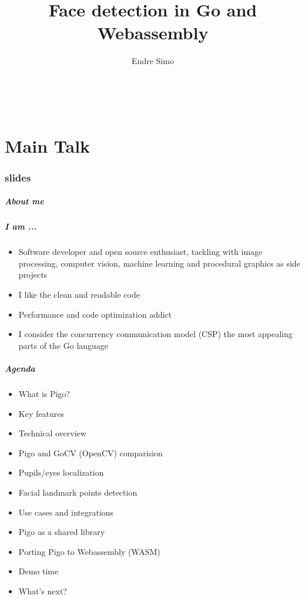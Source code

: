 \documentclass[9pt]{beamer}
\title[Face detection in Go and Webassembly]{Face detection in Go and Webassembly}
\author[Endre Simo]{
 \parbox{0.26\textwidth}{
	\texorpdfstring
	  {
		\centering
 		Endre Simo \\
 		\myblue{\href{https://esimov.com}{\texttt{https://esimov.com}}} \\
 		\myblue{\href{https://github.com/esimov}{\texttt{https://github.com/esimov}}} \\
 		\myblue{\href{https://twitter/simo_endre}{\texttt{https://twitter/simo\_endre}}} \\
 	  }
	{Endre Simo}
}
 }
\begin{document}
\frame{\titlepage
}

\part<presentation>{Main Talk}

\section[slides]{slides}

\begin{frame}[fragile]
\frametitle{About me}


\end{frame}

\begin{frame}[fragile]
\frametitle{I am ...}


\begin{itemize}
\item Software developer and open source enthusiast, tackling with image processing, computer vision, machine learning and procedural graphics as side projects
\item I like the clean and readable code
\item Performance and code optimization addict
\item I consider the concurrency communication model (CSP) the most appealing parts of the Go language
\end{itemize}


\end{frame}

\begin{frame}[fragile]
\frametitle{Agenda}


\begin{itemize}
\item What is Pigo?
\item Key features
\item Technical overview
\item Pigo and GoCV (OpenCV) comparision
\item Pupils/eyes localization
\item Facial landmark points detection
\item Use cases and integrations
\item Pigo as a shared library
\item Porting Pigo to Webassembly (WASM)
\item Demo time
\item What's next?
\end{itemize}


\end{frame}
\end{document}
